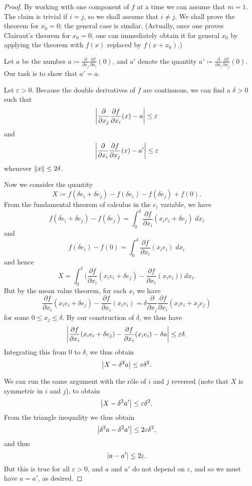 \begin{proof}
    By working with one component of \(f\) at a time we can assume that \(m = 1\).
    The claim is trivial if \(i = j\), so we shall assume that \(i \neq j\).
    We shall prove the theorem for \(x_0 = 0\);
    the general case is similar.
    (Actually, once one proves Clairaut's theorem for \(x_0 = 0\), one can immediately obtain it for general \(x_0\) by applying the theorem with \(f(x)\) replaced by \(f(x + x_0)\).)

    Let \(a\) be the number \(a \coloneqq \frac{\partial}{\partial x_j} \frac{\partial f}{\partial x_i}(0)\), and \(a'\) denote the quantity \(a' \coloneqq \frac{\partial}{\partial x_i} \frac{\partial f}{\partial x_j}(0)\).
    Our task is to show that \(a' = a\).

    Let \(\varepsilon > 0\).
    Because the double derivatives of \(f\) are continuous, we can find a \(\delta > 0\) such that
    \[
        \abs*{\frac{\partial}{\partial x_j} \frac{\partial f}{\partial x_i}(x) - a} \leq \varepsilon
    \]
    and
    \[
        \abs*{\frac{\partial}{\partial x_i} \frac{\partial f}{\partial x_j}(x) - a'} \leq \varepsilon
    \]
    whenever \(\norm*{x} \leq 2\delta\).

    Now we consider the quantity
    \[
        X \coloneqq f(\delta e_i + \delta e_j) - f(\delta e_i) - f(\delta e_j) + f(0).
    \]
    From the fundamental theorem of calculus in the \(e_i\) variable, we have
    \[
        f(\delta e_i + \delta e_j) - f(\delta e_j) = \int_0^{\delta} \frac{\partial f}{\partial x_i}(x_i e_i + \delta e_j) \; d x_i
    \]
    and
    \[
        f(\delta e_i) - f(0) = \int_0^{\delta} \frac{\partial f}{\partial x_i}(x_i e_i) \; d x_i
    \]
    and hence
    \[
        X = \int_0^{\delta} \bigg(\frac{\partial f}{\partial x_i} (x_i e_i + \delta e_j) - \frac{\partial f}{\partial x_i} (x_i e_i)\bigg) \; d x_i.
    \]
    But by the mean value theorem, for each \(x_i\) we have
    \[
        \frac{\partial f}{\partial x_i} (x_i e_i + \delta e_j) - \frac{\partial f}{\partial x_i} (x_i e_i) = \delta \frac{\partial}{\partial x_j} \frac{\partial f}{\partial x_i} (x_i e_i + x_j e_j)
    \]
    for some \(0 \leq x_j \leq \delta\).
    By our construction of \(\delta\), we thus have
    \[
        \abs*{\frac{\partial f}{\partial x_i} (x_i e_i + \delta e_j) - \frac{\partial f}{\partial x_i} (x_i e_i) - \delta a} \leq \varepsilon \delta.
    \]
    Integrating this from \(0\) to \(\delta\), we thus obtain
    \[
        \abs*{X - \delta^2 a} \leq \varepsilon \delta^2.
    \]

    We can run the same argument with the rôle of \(i\) and \(j\) reversed (note that \(X\) is symmetric in \(i\) and \(j\)), to obtain
    \[
        \abs*{X - \delta^2 a'} \leq \varepsilon \delta^2.
    \]
    From the triangle inequality we thus obtain
    \[
        \abs*{\delta^2 a - \delta^2 a'} \leq 2 \varepsilon \delta^2,
    \]
    and thus
    \[
        \abs*{a - a'} \leq 2 \varepsilon.
    \]
    But this is true for all \(\varepsilon > 0\), and \(a\) and \(a'\) do not depend on \(\varepsilon\), and so we must have \(a = a'\), as desired.
\end{proof}

